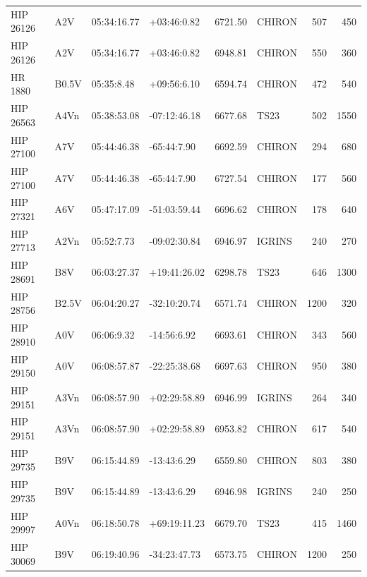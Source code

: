 \documentclass{emulateapj}
\begin{document}
\begin{longtable*}{|l|lllrlrr|}
   HIP 26126 &            A2V &    05:34:16.77 &    +03:46:0.82 &  6721.50 &     CHIRON &      507 &     450 \\
   HIP 26126 &            A2V &    05:34:16.77 &    +03:46:0.82 &  6948.81 &     CHIRON &      550 &     360 \\
     HR 1880 &          B0.5V &     05:35:8.48 &    +09:56:6.10 &  6594.74 &     CHIRON &      472 &     540 \\
   HIP 26563 &           A4Vn &    05:38:53.08 &   -07:12:46.18 &  6677.68 &       TS23 &      502 &    1550 \\
   HIP 27100 &            A7V &    05:44:46.38 &    -65:44:7.90 &  6692.59 &     CHIRON &      294 &     680 \\
   HIP 27100 &            A7V &    05:44:46.38 &    -65:44:7.90 &  6727.54 &     CHIRON &      177 &     560 \\
   HIP 27321 &            A6V &    05:47:17.09 &   -51:03:59.44 &  6696.62 &     CHIRON &      178 &     640 \\
   HIP 27713 &           A2Vn &     05:52:7.73 &   -09:02:30.84 &  6946.97 &     IGRINS &      240 &     270 \\
   HIP 28691 &            B8V &    06:03:27.37 &   +19:41:26.02 &  6298.78 &       TS23 &      646 &    1300 \\
   HIP 28756 &          B2.5V &    06:04:20.27 &   -32:10:20.74 &  6571.74 &     CHIRON &     1200 &     320 \\
   HIP 28910 &            A0V &     06:06:9.32 &    -14:56:6.92 &  6693.61 &     CHIRON &      343 &     560 \\
   HIP 29150 &            A0V &    06:08:57.87 &   -22:25:38.68 &  6697.63 &     CHIRON &      950 &     380 \\
   HIP 29151 &           A3Vn &    06:08:57.90 &   +02:29:58.89 &  6946.99 &     IGRINS &      264 &     340 \\
   HIP 29151 &           A3Vn &    06:08:57.90 &   +02:29:58.89 &  6953.82 &     CHIRON &      617 &     540 \\
   HIP 29735 &            B9V &    06:15:44.89 &    -13:43:6.29 &  6559.80 &     CHIRON &      803 &     380 \\
   HIP 29735 &            B9V &    06:15:44.89 &    -13:43:6.29 &  6946.98 &     IGRINS &      240 &     250 \\
   HIP 29997 &           A0Vn &    06:18:50.78 &   +69:19:11.23 &  6679.70 &       TS23 &      415 &    1460 \\
   HIP 30069 &            B9V &    06:19:40.96 &   -34:23:47.73 &  6573.75 &     CHIRON &     1200 &     250 \\

\end{longtable*}
\end{document}
